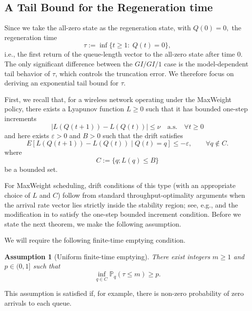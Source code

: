 \documentclass[11pt]{article}
\newtheorem{assumption}{Assumption}
\begin{document}
\subsection{A Tail Bound for the Regeneration time}
\label{subsec:maxweight-regeneration}

Since we take the all-zero state as the regeneration state, with $Q(0)=0,$ the regeneration time
\begin{equation}
\label{eq:tau-def}
\tau := \inf\{t\ge 1:\;
Q(t)=0\},
\end{equation}
i.e., the first return of the queue-length vector to the all-zero state after time $0$.
The only significant difference between the $GI/GI/1$ case is the model-dependent tail behavior of $\tau$, which controls the truncation error.
We therefore focus on deriving an exponential tail bound for $\tau$.

First, we recall that, for a wireless network operating under the MaxWeight policy, there exists a Lyapunov function $L\geq 0$ such that it has bounded one-step increments
\begin{equation}
\label{eq:bounded-increments}
|L(Q(t+1))-L(Q(t))|\le \nu \quad \mathrm{a.s.} \quad\forall t\geq 0
\end{equation}
and here exists $\varepsilon>0$ and $B>0$ such that the drift satisfies
\begin{equation}
\label{eq:negative-drift}
E\!\left[L(Q(t+1))-L(Q(t)) \mid Q(t)=q\right] \le -\varepsilon,
\qquad \forall 
q\notin C.
\end{equation}
where 
\[
C := \{q; L(q)\le B\}
\]
be a bounded set.


For MaxWeight scheduling, drift conditions of this type (with an appropriate choice of $L$ and $C$)
follow from standard throughput-optimality arguments when the arrival rate vector lies strictly inside
the stability region;
see, e.g., \cite{tassiulas1992stability} and the modification in \cite{eryilmaz2012asymptoticallytight} to satisfy the one-step bounded increment condition. Before we state the next theorem, we make the following assumption.

We will require the following finite-time emptying condition.
\begin{assumption}[Uniform finite-time emptying]
\label{ass:finite-emptying}
There exist integers $m\ge1$ and $p\in(0,1]$ such that
\begin{equation}
\label{eq:finite-emptying}
\inf_{q\in C} \mathbb{P}_q(\tau \le m) \ge p.
\end{equation}
\end{assumption}
This assumption is satisfied if, for example, there is non-zero probability of zero arrivals to each queue.
\end{document}
